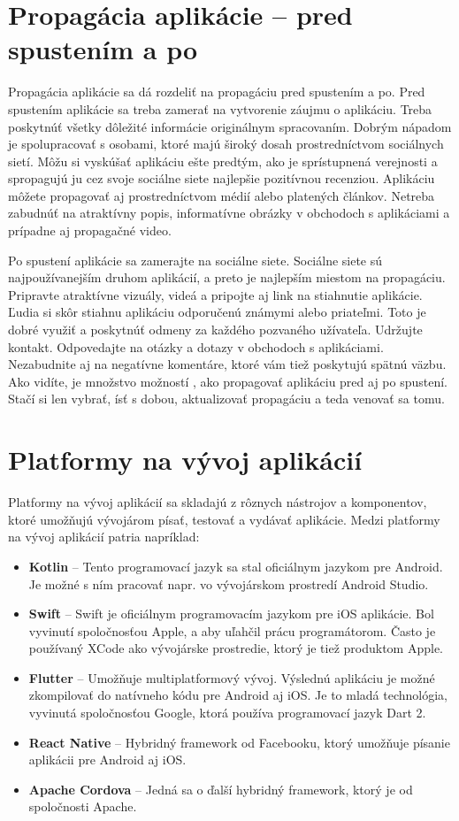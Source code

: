 \documentclass[10pt,twoside,slovak,a4paper]{article}
\begin{document}
\cite{themanifest}


\section{Propagácia aplikácie – pred spustením a po}
\quad Propagácia aplikácie sa dá rozdeliť na propagáciu pred spustením a po. Pred spustením aplikácie sa treba zamerať na vytvorenie záujmu o aplikáciu. Treba poskytnúť všetky dôležité informácie originálnym spracovaním. Dobrým nápadom je spolupracovať s osobami, ktoré majú široký dosah prostredníctvom sociálnych sietí. Môžu si vyskúšať aplikáciu ešte predtým, ako je sprístupnená verejnosti a spropagujú ju cez svoje sociálne siete najlepšie pozitívnou recenziou. Aplikáciu môžete propagovať aj prostredníctvom médií alebo platených článkov. Netreba zabudnúť na atraktívny popis, informatívne obrázky v obchodoch s aplikáciami a prípadne aj propagačné video.

Po spustení aplikácie sa zamerajte na sociálne siete. Sociálne siete sú najpoužívanejším druhom aplikácií, a preto je najlepším miestom na propagáciu. Pripravte atraktívne vizuály, videá a pripojte aj link na stiahnutie aplikácie. Ľudia si skôr stiahnu aplikáciu odporučenú známymi alebo priateľmi. Toto je dobré využiť a poskytnúť odmeny za každého pozvaného užívateľa. Udržujte kontakt. Odpovedajte na otázky a dotazy v obchodoch s aplikáciami. Nezabudnite aj na negatívne komentáre, ktoré vám tiež poskytujú spätnú väzbu. Ako vidíte, je množstvo možností , ako propagovať aplikáciu pred aj po spustení. Stačí si len vybrať, ísť s dobou, aktualizovať propagáciu a teda venovať sa tomu.

\cite{pixelfield}



\section{Platformy na vývoj aplikácií}
\quad Platformy na vývoj aplikácií sa skladajú z rôznych nástrojov a komponentov, ktoré umožňujú vývojárom písať, testovať a vydávať aplikácie. Medzi platformy na vývoj aplikácií patria napríklad:
\begin{itemize}
\item \textbf{Kotlin} – Tento programovací jazyk sa stal oficiálnym jazykom pre Android. Je možné s ním pracovať napr. vo vývojárskom prostredí Android Studio.
\item \textbf{Swift} – Swift je oficiálnym programovacím jazykom pre iOS aplikácie. Bol vyvinutí spoločnosťou Apple, a aby uľahčil prácu programátorom. Často je používaný XCode ako vývojárske prostredie, ktorý je tiež produktom Apple.
\item \textbf{Flutter} – Umožňuje multiplatformový vývoj. Výslednú aplikáciu je možné zkompilovať do natívneho kódu pre Android aj iOS. Je to mladá technológia, vyvinutá spoločnosťou Google, ktorá používa programovací jazyk Dart 2.
\item \textbf{React Native} – Hybridný framework od Facebooku, ktorý umožňuje písanie aplikácii pre Android aj iOS.
\item \textbf{Apache Cordova} – Jedná sa o ďalší hybridný framework, ktorý je od spoločnosti Apache.
\end{itemize}
\end{document}
